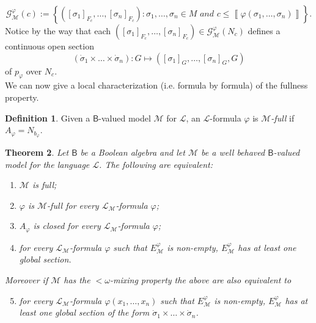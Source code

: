 \documentclass[11pt]{amsart}
\newcommand{\nphi}{\varphi}
\newcommand{\LL}{\mathcal{L}}
\newcommand{\F}{\mathcal{F}}
\newcommand{\G}{\mathcal{G}}
\theoremstyle{plain}
\newtheorem{theorem}{Theorem}[section]
\theoremstyle{definition}
\newtheorem{definition}[theorem]{Definition}
\theoremstyle{plain}
\theoremstyle{remark}
\newcommand{\M}{\mathcal{M}}
\newcommand{\bool}[1]{\mathsf{#1}}
\newcommand{\cp}[1]{\left( #1 \right)}
\newcommand{\Qp}[1]{\left\llbracket #1 \right\rrbracket}
\newcommand{\bp}[1]{\left\lbrace #1 \right\rbrace}
\newcommand{\0}{\mathsf{0}}
\renewcommand{\1}{\mathsf{1}}
\renewcommand{\2}{\mathsf{2}}
\theoremstyle{definition}
\begin{document}
\[
\G^\nphi_\M(c):=\bp{\cp{[\sigma_1]_{F_c}, \dots, [\sigma_n]_{F_c}}: \sigma_1, \dots, \sigma_n\in M\textit{ and }c\leq\Qp{\nphi(\sigma_1, \dots, \sigma_n)}}.
\]
Notice by the way that
 each $\cp{[\sigma_1]_{F_c}, \dots, [\sigma_n]_{F_c}}\in\G^\nphi_\M(N_c)$ defines a continuous open section
\[
(\dot{\sigma}_1\times\dots\times\dot{\sigma}_n): G\mapsto\cp{[\sigma_1]_G, \dots, [\sigma_n]_G, G}
\]
 of $p_{\nphi}$ over $N_c$.\\ 
 We can now give a local characterization (i.e. formula by formula) of the fullness property.
\begin{definition}
Given a $\bool{B}$-valued model $\mathcal{M}$ for $\mathcal{L}$, an
$\mathcal{L}$-formula $\nphi$ is \emph{$\M$-full} if $A_\nphi=N_{b_\nphi}$.
\end{definition}
\begin{theorem}
\label{chr:ful}
Let $\bool{B}$ be a Boolean algebra and let $\M$ be a well behaved $\bool{B}$-valued model for the language $\LL$. The following are equivalent:
\begin{enumerate}
\item \label{chr:ful1} $\M$ is full;
\item\label{chr:ful2} $\nphi$ is $\M$-full
  for every $\LL_\M$-formula $\nphi$;
\item \label{chr:ful3} $A_\nphi$ is closed for every $\LL_\M$-formula $\nphi$;
\item\label{chr:ful4}  for every $\LL_\M$-formula $\nphi$ such that $E^\nphi_\M$ is non-empty, $E^\nphi_\M$ has at least one 
global section.
\end{enumerate}
Moreover if $\M$ has the $<\omega$-mixing property the above are also equivalent to
\begin{enumerate}
\setcounter{enumi}{4}
\item\label{chr:ful5} for every $\LL_\M$-formula $\nphi(x_1, \dots, x_n)$ such that $E^\nphi_\M$ is non-empty, $E^\nphi_\M$ has at least one 
global section of the form $\dot{\sigma}_1\times\dots\times\dot{\sigma}_n$.
\end{enumerate}
\end{theorem}
\end{document}
